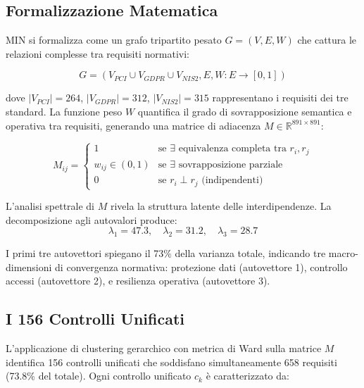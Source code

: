 \subsection{\texorpdfstring{Formalizzazione Matematica}{4.2.1 - Formalizzazione Matematica}}

MIN si formalizza come un grafo tripartito pesato $G = (V, E, W)$ che cattura le relazioni complesse tra requisiti normativi:

\begin{equation}
G = (V_{PCI} \cup V_{GDPR} \cup V_{NIS2}, E, W: E \rightarrow [0,1])
\end{equation}

dove $|V_{PCI}| = 264$, $|V_{GDPR}| = 312$, $|V_{NIS2}| = 315$ rappresentano i requisiti dei tre standard. La funzione peso $W$ quantifica il grado di sovrapposizione semantica e operativa tra requisiti, generando una matrice di adiacenza $M \in \mathbb{R}^{891 \times 891}$:

\begin{equation}
M_{ij} = \begin{cases}
1 & \text{se } \exists \text{ equivalenza completa tra } r_i, r_j \\
w_{ij} \in (0,1) & \text{se } \exists \text{ sovrapposizione parziale} \\
0 & \text{se } r_i \perp r_j \text{ (indipendenti)}
\end{cases}
\end{equation}

L'analisi spettrale di $M$ rivela la struttura latente delle interdipendenze. La decomposizione agli autovalori produce:
$$\lambda_1 = 47.3, \quad \lambda_2 = 31.2, \quad \lambda_3 = 28.7$$

I primi tre autovettori spiegano il 73\% della varianza totale, indicando tre macro-dimensioni di convergenza normativa: protezione dati (autovettore 1), controllo accessi (autovettore 2), e resilienza operativa (autovettore 3).

\subsection{\texorpdfstring{I 156 Controlli Unificati}{4.2.2 - I 156 Controlli Unificati}}

L'applicazione di clustering gerarchico con metrica di Ward sulla matrice $M$ identifica 156 controlli unificati che soddisfano simultaneamente 658 requisiti (73.8\% del totale). Ogni controllo unificato $c_k$ è caratterizzato da:

